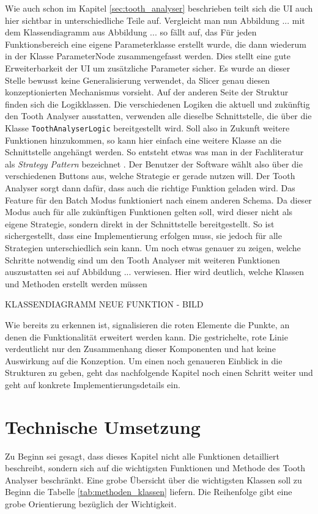 Wie auch schon im Kapitel \ref{sec:tooth_analyser} beschrieben teilt sich die \ac{UI}
auch hier sichtbar in unterschiedliche Teile auf. Vergleicht man nun Abbildung ...
mit dem Klassendiagramm aus Abbildung ... so fällt auf, das Für jeden
Funktionsbereich eine eigene Parameterklasse erstellt wurde, die dann wiederum in
der Klasse ParameterNode zusammengefasst werden. Dies stellt eine gute
Erweiterbarkeit der \ac{UI} um zusätzliche Parameter sicher. Es wurde an dieser
Stelle bewusst keine Generalisierung verwendet, da Slicer genau diesen konzeptionierten
Mechanismus vorsieht. Auf der anderen Seite der Struktur finden sich die
Logikklassen. Die verschiedenen Logiken die aktuell und zukünftig den Tooth Analyser
ausstatten, verwenden alle dieselbe Schnittstelle, die über die Klasse \texttt{ToothAnalyserLogic}
bereitgestellt wird. Soll also in Zukunft weitere Funktionen hinzukommen, so
kann hier einfach eine weitere Klasse an die Schnittstelle angehängt werden. So entsteht
etwas was man in der Fachliteratur als \textit{Strategy Pattern} bezeichnet
\citep[vgl.][S. ...]{siebler2014}. Der Benutzer der Software wählt also über die
verschiedenen Buttons aus, welche Strategie er gerade nutzen will. Der Tooth
Analyser sorgt dann dafür, dass auch die richtige Funktion geladen wird. Das
Feature für den Batch Modus funktioniert nach einem anderen Schema. Da dieser Modus
auch für alle zukünftigen Funktionen gelten soll, wird dieser nicht als eigene
Strategie, sondern direkt in der Schnittstelle bereitgestellt. So ist
sichergestellt, dass eine Implementierung erfolgen muss, sie jedoch für alle
Strategien unterschiedlich sein kann. Um noch etwas genauer zu zeigen, welche
Schritte notwendig sind um den Tooth Analyser mit weiteren Funktionen
auszustatten sei auf Abbildung ... verwiesen. Hier wird deutlich, welche Klassen
und Methoden erstellt werden müssen

KLASSENDIAGRAMM NEUE FUNKTION - BILD

Wie bereits zu erkennen ist, signalisieren die roten Elemente die Punkte, an
denen die Funktionalität erweitert werden kann. Die gestrichelte, rote Linie
verdeutlicht nur den Zusammenhang dieser Komponenten und hat keine Auswirkung
auf die Konzeption. Um einen noch genaueren Einblick in die Strukturen zu geben,
geht das nachfolgende Kapitel noch einen Schritt weiter und geht auf konkrete
Implementierungsdetails ein.

\pagebreak

\section{Technische Umsetzung}
\label{sec:technische_umsetzung} Zu Beginn sei gesagt, dass dieses Kapitel nicht
alle Funktionen detailliert beschreibt, sondern sich auf die wichtigsten Funktionen
und Methode des Tooth Analyser beschränkt. Eine grobe Übersicht über die
wichtigsten Klassen soll zu Beginn die Tabelle \ref{tab:methoden_klassen}
liefern. Die Reihenfolge gibt eine grobe Orientierung bezüglich der Wichtigkeit.

